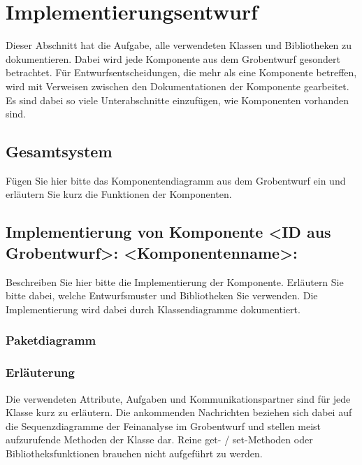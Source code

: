 \chapter{Implementierungsentwurf}
Dieser Abschnitt hat die Aufgabe, alle verwendeten Klassen und Bibliotheken zu
dokumentieren. Dabei wird jede Komponente aus dem Grobentwurf gesondert
betrachtet. Für Entwurfsentscheidungen, die mehr als eine Komponente betreffen,
wird mit Verweisen zwischen den Dokumentationen der Komponente gearbeitet.  Es
sind dabei so viele Unterabschnitte einzufügen, wie Komponenten vorhanden sind.


\section{Gesamtsystem}
Fügen Sie hier bitte das Komponentendiagramm aus dem Grobentwurf ein und
erläutern Sie kurz die Funktionen der Komponenten.
\section{Implementierung von Komponente
         <ID aus Grobentwurf>: <Komponentenname>:}

Beschreiben Sie hier bitte die Implementierung der Komponente. Erläutern Sie
bitte dabei, welche Entwurfsmuster und Bibliotheken Sie verwenden. Die
Implementierung wird dabei durch Klassendiagramme dokumentiert.

\subsection{Paketdiagramm}
\subsection{Erläuterung}

Die verwendeten Attribute, Aufgaben und Kommunikationspartner sind für jede
Klasse kurz zu erläutern. Die ankommenden Nachrichten beziehen sich dabei auf
die Sequenzdiagramme der Feinanalyse im Grobentwurf und stellen meist
aufzurufende Methoden der Klasse dar.  Reine get- / set-Methoden oder
Bibliotheksfunktionen brauchen nicht aufgeführt zu werden.


